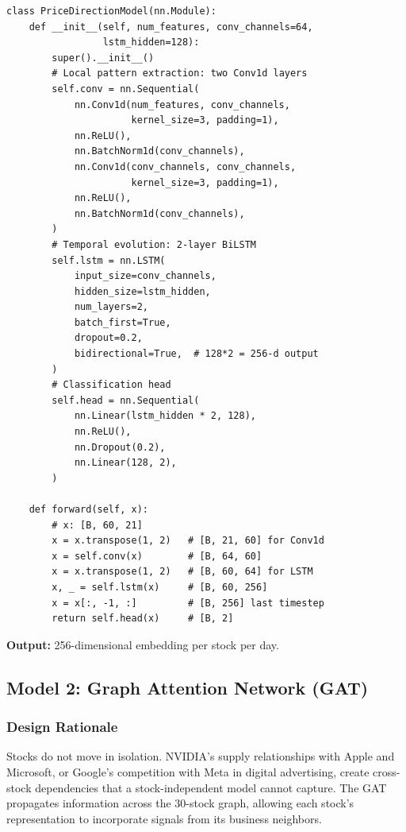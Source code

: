 \documentclass[12pt,a4paper]{article}
\begin{document}
\begin{lstlisting}[caption={CNN-BiLSTM price encoder (src/models/price\_model.py)}]
class PriceDirectionModel(nn.Module):
    def __init__(self, num_features, conv_channels=64,
                 lstm_hidden=128):
        super().__init__()
        # Local pattern extraction: two Conv1d layers
        self.conv = nn.Sequential(
            nn.Conv1d(num_features, conv_channels,
                      kernel_size=3, padding=1),
            nn.ReLU(),
            nn.BatchNorm1d(conv_channels),
            nn.Conv1d(conv_channels, conv_channels,
                      kernel_size=3, padding=1),
            nn.ReLU(),
            nn.BatchNorm1d(conv_channels),
        )
        # Temporal evolution: 2-layer BiLSTM
        self.lstm = nn.LSTM(
            input_size=conv_channels,
            hidden_size=lstm_hidden,
            num_layers=2,
            batch_first=True,
            dropout=0.2,
            bidirectional=True,  # 128*2 = 256-d output
        )
        # Classification head
        self.head = nn.Sequential(
            nn.Linear(lstm_hidden * 2, 128),
            nn.ReLU(),
            nn.Dropout(0.2),
            nn.Linear(128, 2),
        )

    def forward(self, x):
        # x: [B, 60, 21]
        x = x.transpose(1, 2)   # [B, 21, 60] for Conv1d
        x = self.conv(x)        # [B, 64, 60]
        x = x.transpose(1, 2)   # [B, 60, 64] for LSTM
        x, _ = self.lstm(x)     # [B, 60, 256]
        x = x[:, -1, :]         # [B, 256] last timestep
        return self.head(x)     # [B, 2]
\end{lstlisting}

\textbf{Output:} 256-dimensional embedding per stock per day.

\subsection{Model 2: Graph Attention Network (GAT)}

\subsubsection{Design Rationale}

Stocks do not move in isolation. NVIDIA's supply relationships with Apple and Microsoft, or Google's competition with Meta in digital advertising, create cross-stock dependencies that a stock-independent model cannot capture. The GAT propagates information across the 30-stock graph, allowing each stock's representation to incorporate signals from its business neighbors.
\end{document}
